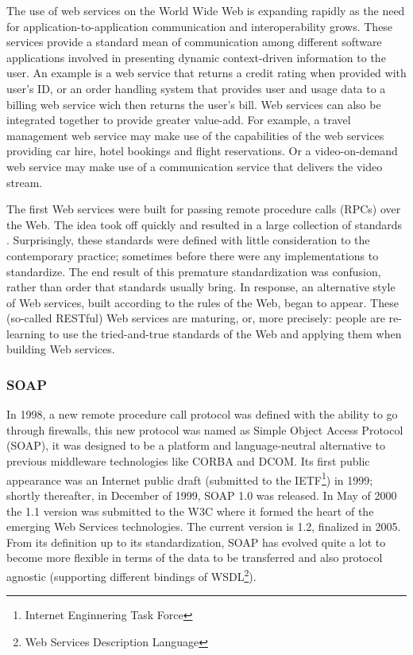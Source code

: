 The use of web services on the World Wide Web is expanding rapidly as the need for application-to-application communication and interoperability grows. These services provide a standard mean of communication among different software applications involved in presenting dynamic context-driven information to the user\cite{Austin:2004}. An example is a web service that returns a credit rating when provided with user's ID, or an order handling system that provides user and usage data to a billing web service wich then returns the user's bill. Web services can also be integrated together to provide greater value-add. For example, a travel management web service may make use of the capabilities of the web services providing car hire, hotel bookings and flight reservations. Or a video-on-demand web service may make use of a communication service that delivers the video stream.

The first Web services were built for passing remote procedure calls (RPCs) over the Web. The idea took off quickly and resulted in a large collection of standards %
. Surprisingly, these standards were defined with little consideration to the contemporary practice; sometimes before there were any implementations to standardize. The end result of this premature standardization was confusion, rather than order that standards usually bring. In response, an alternative style of Web services, built according to the rules of the Web, began to appear. These (so-called RESTful) Web services are maturing, or, more precisely: people are re-learning to use the tried-and-true standards of the Web and applying them when building Web services.

\subsubsection{SOAP}
In 1998, a new remote procedure call protocol was defined with the ability to go through firewalls, this new protocol was named as Simple Object Access Protocol (SOAP), it was designed to be a platform and language-neutral alternative to previous middleware technologies like CORBA and DCOM. Its first public appearance was an Internet public draft (submitted to the IETF\footnote{Internet Enginnering Task Force}) in 1999; shortly thereafter, in December of 1999, SOAP 1.0 was released. In May of 2000 the 1.1 version was submitted to the W3C where it formed the heart of the emerging Web Services technologies. The current version is 1.2, finalized in 2005. From its definition up to its standardization, SOAP has evolved quite a lot to become more flexible in terms of the data to be transferred and also protocol agnostic (supporting different bindings of WSDL\footnote{Web Services Description Language})\cite{Pautasso:2007}.

